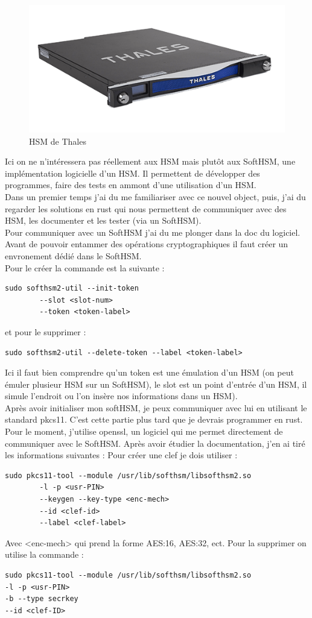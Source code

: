 \documentclass[a4paper, 12pt]{article}
\begin{document}
\begin{figure}[h]
	\centering
	\includegraphics[width=.7\textwidth]{img/hsm.png}
	\caption{HSM de Thales}
	\label{hsmthales}
\end{figure}

Ici on ne n'intéressera pas réellement aux HSM mais plutôt aux SoftHSM, une implémentation logicielle d'un HSM. Il permettent de développer des programmes, faire des tests en ammont d'une utilisation d'un HSM. \\

Dans un premier temps j'ai du me familiariser avec ce nouvel object, puis, j'ai du regarder les solutions en rust qui nous permettent de communiquer avec des HSM, les documenter et les tester (via un SoftHSM). \\


Pour communiquer avec un SoftHSM j'ai du me plonger dans la doc du logiciel. Avant de pouvoir entammer des opérations cryptographiques il faut créer un envronement dédié dans le SoftHSM. \\
Pour le créer la commande est la suivante :
\begin{verbatim}
sudo softhsm2-util --init-token 
		--slot <slot-num> 
		--token <token-label>
\end{verbatim}
et pour le supprimer :
\begin{verbatim}
sudo softhsm2-util --delete-token --label <token-label>
\end{verbatim}
Ici il faut bien comprendre qu'un token est une émulation d'un HSM (on peut émuler plusieur HSM sur un SoftHSM), le slot est un point d'entrée d'un HSM, il simule l'endroit ou l'on insère nos informations dans un HSM). \\
Après avoir initialiser mon softHSM, je peux communiquer avec lui en utilisant le standard pkcs11. C'est cette partie plus tard que je devrais programmer en rust. Pour le moment, j'utilise openssl, un logiciel qui me permet directement de communiquer avec le SoftHSM. Après avoir étudier la documentation, j'en ai tiré les informations suivantes :
Pour créer une clef je dois utiliser : 
\begin{verbatim}
sudo pkcs11-tool --module /usr/lib/softhsm/libsofthsm2.so 
		-l -p <usr-PIN> 
		--keygen --key-type <enc-mech> 
		--id <clef-id> 
		--label <clef-label>
\end{verbatim}
Avec <enc-mech> qui prend la forme AES:16, AES:32, ect. Pour la supprimer on utilise la commande : 
\begin{verbatim}
sudo pkcs11-tool --module /usr/lib/softhsm/libsofthsm2.so 
-l -p <usr-PIN> 
-b --type secrkey 
--id <clef-ID>
\end{verbatim}
\end{document}
